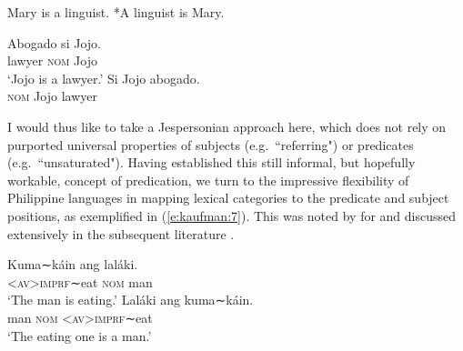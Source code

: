 \documentclass[output=paper]{langsci/langscibook}
\begin{document}
\begin{exe}
\ex\label{e:kaufman:5}
	\begin{xlist}
	\ex\label{e:kaufman:5a} Mary is a linguist.
	\ex\label{e:kaufman:5b} {*A linguist is Mary.}
\end{xlist}
\end{exe}

\begin{exe}
\ex\label{e:kaufman:6}
	\begin{xlist}
	\ex\label{e:kaufman:6a}
    \gll Abogado si Jojo.\\
	lawyer \textsc{nom} Jojo\\
	\glt `Jojo is a lawyer.'
	\ex\label{e:kaufman:6b}
    \gll {\USStar}Si Jojo abogado.\\
	\phantom{*}\textsc{nom} Jojo lawyer\\
\end{xlist}
\end{exe}

\noindent
I would thus like to take a Jespersonian approach here, which does not rely on purported universal properties of subjects (e.g.\ ``referring") or predicates (e.g.\ ``unsaturated"). Having established this still informal, but hopefully workable, concept of predication, we turn to the impressive flexibility of Philippine languages in mapping lexical categories to the predicate and subject positions, as exemplified in (\ref{e:kaufman:7}). This was noted by \citet{Bloomfield:1917} for  and discussed extensively in the subsequent literature \citep{Gil:1993, Himmelmann:1987, Himmelmann:1991, Foley:2008, Schachter:1982, Kaufman:2009cons}.

\begin{exe}
	\ex\label{e:kaufman:7}
	\begin{xlist}
		\ex\label{e:kaufman:7a}
        \gll K{\USSmaller}um{\USGreater}a∼káin ang laláki.\\
		\textsc{<av>imprf}∼eat  \textsc{nom} man\\
		\glt `The man is eating.’
		\ex\label{e:kaufman:7b}
        \gll Laláki ang k{\USSmaller}um{\USGreater}a∼káin.\\
		man \textsc{nom} \textsc{<av>imprf}∼eat\\
		\glt `The eating one is a man.’
	\end{xlist}
\end{exe}
\end{document}
